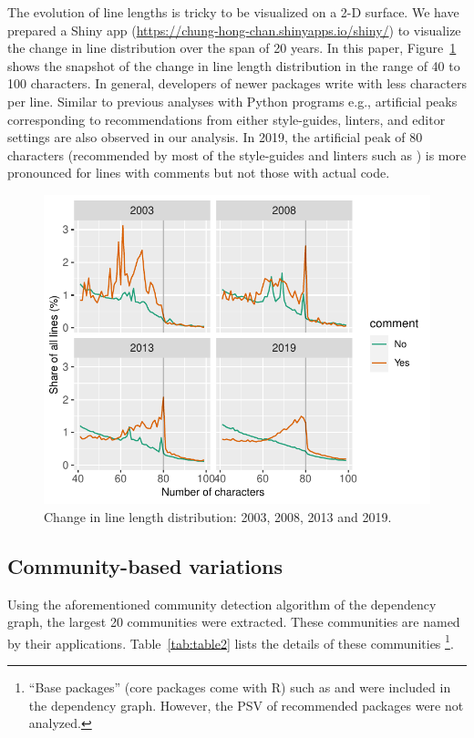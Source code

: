 The evolution of line lengths is tricky to be visualized on a 2-D surface. We have prepared a Shiny app (\url{https://chung-hong-chan.shinyapps.io/shiny/}) to visualize the change in line distribution over the span of 20 years. In this paper, Figure~\ref{figure:fig3} shows the snapshot of the change in line length distribution in the range of 40 to 100 characters. In general, developers of newer packages write with less characters per line. Similar to previous analyses with Python programs e.g.\citet{vanderplas}, artificial peaks corresponding to recommendations from either style-guides, linters, and editor settings are also observed in our analysis. In 2019, the artificial peak of 80 characters (recommended by most of the style-guides and linters such as ) is more pronounced for lines with comments but not those with actual code.

\begin{figure}[htbp]
  \centering
  \includegraphics{fig3}
  \caption{Change in line length distribution: 2003, 2008, 2013 and 2019.}
  \label{figure:fig3}
\end{figure}


\subsection{Community-based variations}

Using the aforementioned community detection algorithm of the dependency graph, the largest 20 communities were extracted. These communities are named by their applications. Table~\ref{tab:table2} lists the details of these communities \footnote{``Base packages'' (core packages come with R) such as  and  were included in the dependency graph. However, the PSV of recommended packages were not analyzed.}.

